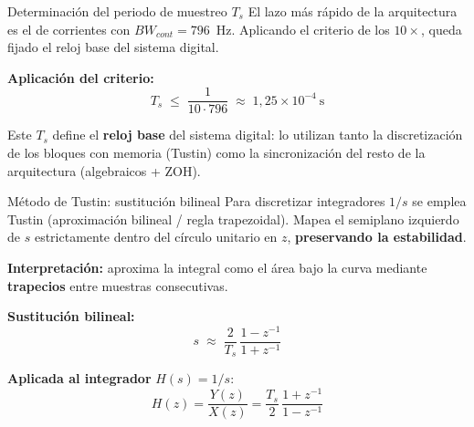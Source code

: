 \documentclass[aspectratio=169,t]{beamer}
\begin{document}
\begin{frame}{Determinación del periodo de muestreo $T_s$}
{\small\color{uncGray}El lazo más rápido de la arquitectura es el de corrientes con $BW_{cont}=796$~Hz. Aplicando el criterio de los $10\times$, queda fijado el reloj base del sistema digital.}\par
\vspace{10mm}

\textbf{Aplicación del criterio:}
\begin{equation*}
T_s \;\leq\; \frac{1}{10\cdot 796} \;\approx\; 1{,}25\!\times\!10^{-4}~\text{s}
\end{equation*}

\vspace{8mm}
{\small Este $T_s$ define el \textbf{reloj base} del sistema digital: lo utilizan tanto la discretización de los bloques con memoria (Tustin) como la sincronización del resto de la arquitectura (algebraicos + ZOH).}
\end{frame}

\begin{frame}{Método de Tustin: sustitución bilineal}
{\small\color{uncGray}Para discretizar integradores $1/s$ se emplea Tustin (aproximación bilineal / regla trapezoidal). Mapea el semiplano izquierdo de $s$ estrictamente dentro del círculo unitario en $z$, \textbf{preservando la estabilidad}.}\par
\vspace{3mm}

\textbf{Interpretación:} aproxima la integral como el área bajo la curva mediante \textbf{trapecios} entre muestras consecutivas.

\textbf{Sustitución bilineal:}
\begin{equation*}
s \;\approx\; \frac{2}{T_s}\,\frac{1 - z^{-1}}{1 + z^{-1}}
\end{equation*}

\textbf{Aplicada al integrador} $H(s) = 1/s$:
\begin{equation*}
H(z) = \frac{Y(z)}{X(z)} = \frac{T_s}{2}\,\frac{1 + z^{-1}}{1 - z^{-1}}
\end{equation*}
\end{frame}
\end{document}
